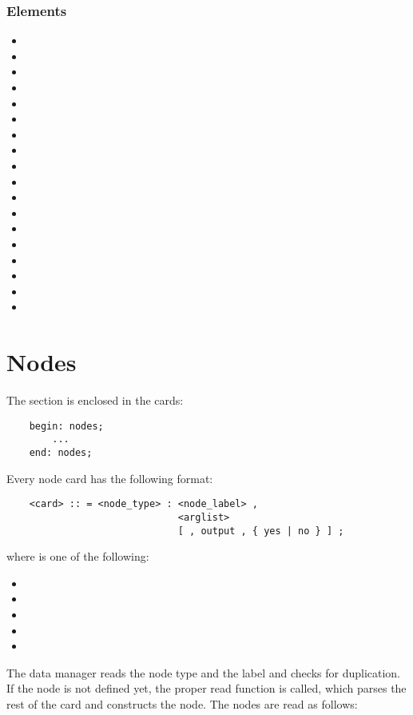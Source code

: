 \subsection{Elements}
\begin{itemize}
\item {}
\item {}
\item {}
\item {}
\item {}
\item {}
\item {}
\item {}
\item {}
\item {}
\item {}
\item {}
\item {}
\item {}
\item {}
\item {}
\item {}
\item {}
\end{itemize}




\chapter{Nodes}
The  section is enclosed in the cards:
\begin{verbatim}
    begin: nodes;
        ...
    end: nodes;
\end{verbatim}
Every node card has the following format:
\begin{verbatim}
    <card> :: = <node_type> : <node_label> ,
                              <arglist>
                              [ , output , { yes | no } ] ;
\end{verbatim}
where  is one of the following:
\begin{itemize}
    \item {}
    \item {}
    \item {}
    \item {}
    \item {}
\end{itemize}
The data manager reads the node type and the label and checks for
duplication. If the node is not defined yet, the proper read function is
called, which parses the rest of the card and constructs the node.
The nodes are read as follows:




